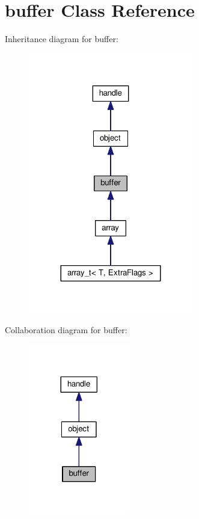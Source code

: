 \hypertarget{classbuffer}{}\section{buffer Class Reference}
\label{classbuffer}


Inheritance diagram for buffer\+:
\nopagebreak
\begin{figure}[H]
\begin{center}
\leavevmode
\includegraphics[width=204pt]{classbuffer__inherit__graph}
\end{center}
\end{figure}


Collaboration diagram for buffer\+:
\nopagebreak
\begin{figure}[H]
\begin{center}
\leavevmode
\includegraphics[width=125pt]{classbuffer__coll__graph}
\end{center}
\end{figure}

